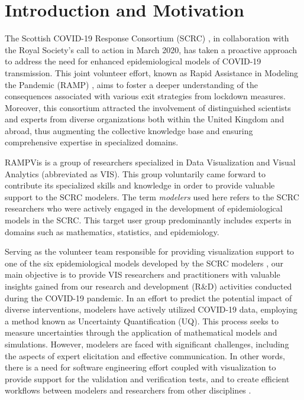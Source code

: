 \section{Introduction and Motivation}
\label{sec:intro}

The Scottish COVID-19 Response Consortium (SCRC) \cite{2020University}, in collaboration with the Royal Society's call to action in March 2020, has taken a proactive approach to address the need for enhanced epidemiological models of COVID-19 transmission.
This joint volunteer effort, known as Rapid Assistance in Modeling the Pandemic (RAMP) \cite{2020Rapid}, aims to foster a deeper understanding of the consequences associated with various exit strategies from lockdown measures.
Moreover, this consortium attracted the involvement of distinguished scientists and experts from diverse organizations both within the United Kingdom and abroad, thus augmenting the collective knowledge base and ensuring comprehensive expertise in specialized domains.

RAMPVis \cite{2020Visualization} is a group of researchers specialized in Data Visualization and Visual Analytics (abbreviated as VIS).
This group voluntarily came forward to contribute its specialized skills and knowledge in order to provide valuable support to the SCRC modelers.
The term \textit{modelers} used here refers to the SCRC researchers who were actively engaged in the development of epidemiological models in the SCRC.
This target user group predominantly includes experts in domains such as mathematics, statistics, and epidemiology.

Serving as the volunteer team responsible for providing visualization support to one of the six epidemiological models developed by the SCRC modelers \cite{chen2022RAMPVIS}, our main objective is to provide VIS researchers and practitioners with valuable insights gained from our research and development (R\&D) activities conducted during the COVID-19 pandemic.
In an effort to predict the potential impact of diverse interventions, modelers have actively utilized COVID-19 data, employing a method known as Uncertainty Quantification (UQ).
This process seeks to measure uncertainties through the application of mathematical models and simulations.
However, modelers are faced with significant challenges, including the aspects of expert elicitation and effective communication.
In other words, there is a need for software engineering effort coupled with visualization to provide support for the validation and verification tests, and to create efficient workflows between modelers and researchers from other disciplines \cite{ackland2022Royal}.

